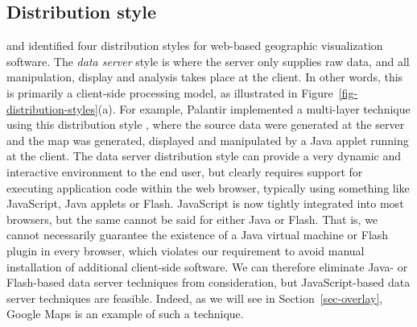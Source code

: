 \documentclass[acmnow]{acmtrans2m}
\begin{document}
\subsection{Distribution style}
\label{sec-distribution}

 and  identified four
distribution styles for web-based geographic visualization software. The
\emph{data server} style is where the server only supplies raw data, and
all manipulation, display and analysis takes place at the client. In
other words, this is primarily a client-side processing model, as
illustrated in Figure~\ref{fig-distribution-styles}(a). For example,
Palantir implemented a multi-layer technique using this distribution
style \cite{Papa-N-1998-Palantir}, where the source data were generated
at the server and the map was generated, displayed and manipulated by a
Java applet running at the client. The data server distribution style
can provide a very dynamic and interactive environment to the end user,
but clearly requires support for executing application code within the
web browser, typically using something like JavaScript, Java applets or
Flash. JavaScript is now tightly integrated into most browsers, but the
same cannot be said for either Java or Flash. That is, we cannot
necessarily guarantee the existence of a Java virtual machine or Flash
plugin in every browser, which violates our requirement to avoid manual
installation of additional client-side software. We can therefore
eliminate Java- or Flash-based data server techniques from
consideration, but JavaScript-based data server techniques are feasible.
Indeed, as we will see in Section~\ref{sec-overlay}, Google Maps is an
example of such a technique.
\end{document}
